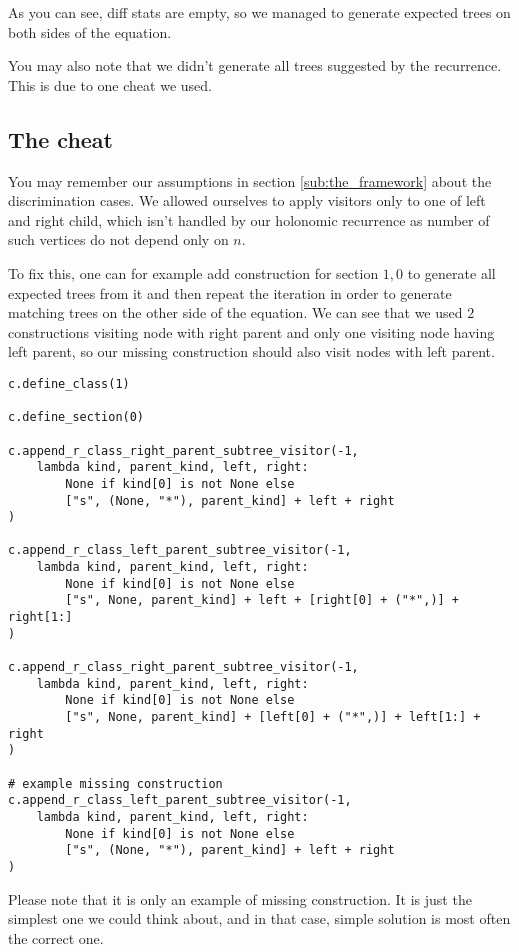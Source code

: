 \documentclass[final]{article}
\theoremstyle{definition}
\theoremstyle{remark}
\begin{document}
As you can see, diff stats are empty, so we managed to generate expected trees on both sides of the equation.

You may also note that we didn't generate all trees suggested by the recurrence. This is due to one cheat we used.

\subsection{The cheat}%
\label{sub:the_cheat}

You may remember our assumptions in section \ref{sub:the_framework} about the discrimination cases. We allowed ourselves to apply visitors only to one of left and right child, which isn't handled by our holonomic recurrence as number of such vertices do not depend only on \(n\).

To fix this, one can for example add construction for section \(1, 0\) to generate all expected trees from it and then repeat the iteration in order to generate matching trees on the other side of the equation. We can see that we used \(2\) constructions visiting node with right parent and only one visiting node having left parent, so our missing construction should also visit nodes with left parent.

\begin{lstlisting}
c.define_class(1)

c.define_section(0)

c.append_r_class_right_parent_subtree_visitor(-1,
    lambda kind, parent_kind, left, right:
        None if kind[0] is not None else
        ["s", (None, "*"), parent_kind] + left + right
)

c.append_r_class_left_parent_subtree_visitor(-1,
    lambda kind, parent_kind, left, right:
        None if kind[0] is not None else
        ["s", None, parent_kind] + left + [right[0] + ("*",)] + right[1:]
)

c.append_r_class_right_parent_subtree_visitor(-1,
    lambda kind, parent_kind, left, right:
        None if kind[0] is not None else
        ["s", None, parent_kind] + [left[0] + ("*",)] + left[1:] + right
)

# example missing construction
c.append_r_class_left_parent_subtree_visitor(-1,
    lambda kind, parent_kind, left, right:
        None if kind[0] is not None else
        ["s", (None, "*"), parent_kind] + left + right
)
\end{lstlisting}

Please note that it is only an example of missing construction. It is just the simplest one we could think about, and in that case, simple solution is most often the correct one.
\end{document}
